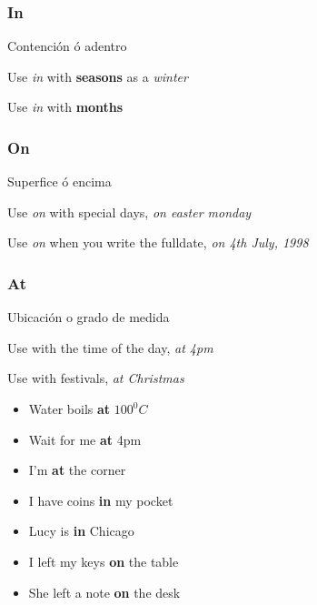 \documentclass{elegantbook}
\begin{document}
        \subsubsection*{In}
        \begin{property}
            Contención ó adentro
        \end{property}
        \begin{property}
            Use \emph{in} with \textbf{seasons} as a \emph{winter}
        \end{property}
        \begin{property}
            Use \emph{in} with \textbf{months}
        \end{property}
        \subsubsection*{On}
        \begin{property}
            Superfice ó encima
        \end{property}
        \begin{property}
            Use \emph{on} with special days, \emph{on easter monday}
        \end{property}
        \begin{property}
            Use \emph{on} when you write the fulldate, \emph{on 4th July, 1998}
        \end{property}
        \subsubsection*{At}
        \begin{property}
            Ubicación o grado de medida
        \end{property}
        \begin{property}
            Use with the time of the day, \emph{at 4pm}
        \end{property}
        \begin{property}
            Use with festivals, \emph{at Christmas}
        \end{property}

        \begin{example}
            \begin{itemize}
                \item Water boils \textbf{at} $100^0C$
                \item Wait for me \textbf{at} 4pm
                \item I'm \textbf{at} the corner
                \item I have coins \textbf{in} my pocket
                \item Lucy is \textbf{in} Chicago
                \item I left my keys \textbf{on} the table
                \item She left a note \textbf{on} the desk
            \end{itemize}
        \end{example}
\end{document}
